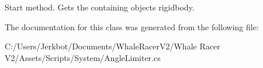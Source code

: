 Start method. Gets the containing object\textquotesingle{}s rigidbody. 



The documentation for this class was generated from the following file\+:\begin{DoxyCompactItemize}
\item 
C\+:/\+Users/\+Jerkbot/\+Documents/\+Whale\+Racer\+V2/\+Whale Racer V2/\+Assets/\+Scripts/\+System/Angle\+Limiter.\+cs\end{DoxyCompactItemize}
